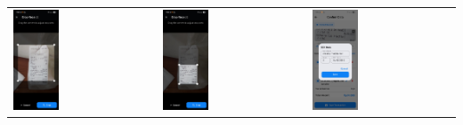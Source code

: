 \begin{tabular}{lll}
    \includegraphics[width=0.33\textwidth]{images/UI/struk-crop.jpg} &
    \includegraphics[width=0.33\textwidth]{images/UI/struk-cropped.jpg} &
    \includegraphics[width=0.33\textwidth]{images/UI/struk-edit.jpg}

\end{tabular}
